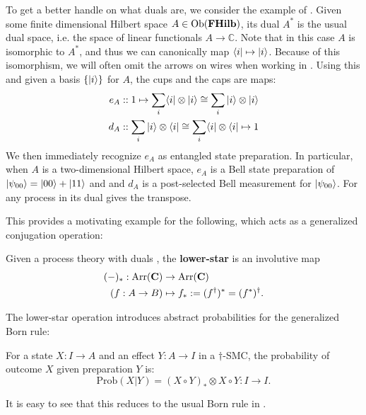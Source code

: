 \begin{example}
\label{ex:bellduals}
To get a better handle on what duals are, we consider the example of . Given some finite dimensional Hilbert space $A\in\mbox{Ob}(\mathbf{FHilb})$, its dual $A^*$ is the usual dual space, i.e. the space of linear functionals $A\to \mathbb{C}$. Note that in this case $A$ is isomorphic to $A^*$, and thus we can canonically map $\langle i |\mapsto| i \rangle$. Because of this isomorphism, we will often omit the arrows on wires when working in . Using this and given a basis $\{ | i \rangle \}$ for $A$, the cups and the caps are maps:
\begin{align}
e_A &:: 1\mapsto \sum_i\langle i |\otimes| i \rangle\cong\sum_i| i \rangle\otimes| i \rangle
\\
d_A &:: \sum_i| i \rangle\otimes\langle i |\cong\sum_i\langle i |\otimes\langle i | \mapsto 1
\end{align}
We then immediately recognize $e_A$ as entangled state preparation. In particular, when $A$ is a two-dimensional Hilbert space, $e_A$ is a Bell state preparation of $| \psi_{00} \rangle=| 00 \rangle+| 11 \rangle$ and  and $d_A$ is a post-selected Bell measurement for $| \psi_{00} \rangle$. For any process in  its dual gives the transpose.
\end{example}

This provides a motivating example for the following, which acts as a generalized conjugation operation:

\begin{defn}
Given a process theory with duals , the \textbf{lower-star} is an involutive map 
\begin{align*}
(-)_*:\mbox{Arr}(\mathbf{C})&\to\mbox{Arr}(\mathbf{C}) \\
\left(f:A\to B\right) &\mapsto f_*:=(f^\dagger)^*=(f^*)^\dagger.
\end{align*}
\end{defn}

The lower-star operation introduces abstract probabilities for the generalized Born rule:
\begin{defn}
\label{def:bornrule}
For a state $X:I\to A$ and an effect $Y:A\to I$ in a $\dagger$-SMC, the probability of outcome $X$ given preparation $Y$ is:
\begin{equation}
\mbox{Prob}(X|Y) = (X\circ Y)_*\otimes X\circ Y:I\to I.
\end{equation}
\end{defn}
\noindent It is easy to see that this reduces to the usual Born rule in .

